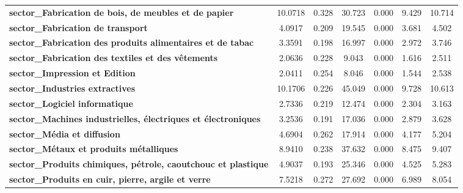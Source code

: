 \begin{center}
\begin{tabular}{lcccccc}
\textbf{sector\_Fabrication de bois, de meubles et de papier}         &      10.0718  &        0.328     &    30.723  &         0.000        &        9.429    &       10.714     \\
\textbf{sector\_Fabrication de transport}                             &       4.0917  &        0.209     &    19.545  &         0.000        &        3.681    &        4.502     \\
\textbf{sector\_Fabrication des produits alimentaires et de tabac}    &       3.3591  &        0.198     &    16.997  &         0.000        &        2.972    &        3.746     \\
\textbf{sector\_Fabrication des textiles et des vêtements}            &       2.0636  &        0.228     &     9.043  &         0.000        &        1.616    &        2.511     \\
\textbf{sector\_Impression et Edition}                                &       2.0411  &        0.254     &     8.046  &         0.000        &        1.544    &        2.538     \\
\textbf{sector\_Industries extractives}                               &      10.1706  &        0.226     &    45.049  &         0.000        &        9.728    &       10.613     \\
\textbf{sector\_Logiciel informatique}                                &       2.7336  &        0.219     &    12.474  &         0.000        &        2.304    &        3.163     \\
\textbf{sector\_Machines industrielles, électriques et électroniques} &       3.2536  &        0.191     &    17.036  &         0.000        &        2.879    &        3.628     \\
\textbf{sector\_Média et diffusion}                                   &       4.6904  &        0.262     &    17.914  &         0.000        &        4.177    &        5.204     \\
\textbf{sector\_Métaux et produits métalliques}                       &       8.9410  &        0.238     &    37.632  &         0.000        &        8.475    &        9.407     \\
\textbf{sector\_Produits chimiques, pétrole, caoutchouc et plastique} &       4.9037  &        0.193     &    25.346  &         0.000        &        4.525    &        5.283     \\
\textbf{sector\_Produits en cuir, pierre, argile et verre}            &       7.5218  &        0.272     &    27.692  &         0.000        &        6.989    &        8.054     \\

\end{tabular}
\end{center}
